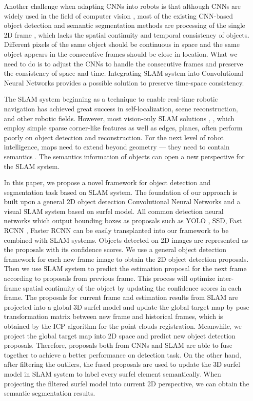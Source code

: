 \documentclass[conference]{IEEEtran}
\begin{document}
Another challenge when adapting CNNs into robots is that although CNNs are widely used in the field of computer vision \cite{Liu2015}, most of the existing CNN-based object detection and semantic segmentation methods are processing of the single 2D frame \cite{long2015fully}, \cite{Zheng2015} which lacks the spatial continuity and temporal consistency of objects. Different pixels of the same object should be continuous in space and the same object appears in the consecutive frames should be close in location. What we need to do is to adjust the CNNs to handle the consecutive frames and preserve the consistency  of space and time. Integrating SLAM system into Convolutional Neural Networks provides a possible solution to preserve time-space consistency. 

The SLAM system beginning as a technique to enable real-time robotic navigation has achieved great success in self-localization, scene reconstruction, and other robotic fields. However, most vision-only SLAM solutions \cite{Whelan15rss}, \cite{Whelan_real-timelarge}, \cite{Zuo2017} which employ simple sparse corner-like features as well as edges, planes, often perform poorly on object detection and reconstruction. For the next level of robot intelligence, maps need to extend beyond geometry — they need to contain semantics \cite{Kundu2014}. The semantics information of objects can open a new perspective for the SLAM system. 

In this paper, we propose a novel framework for object detection and segmentation task based on SLAM system. The foundation of our approach  is built upon a  general 2D object detection Convolutional Neural Networks and a visual SLAM system based on surfel model. All common detection neural networks which output bounding boxes as proposals such as YOLO \cite{Redmon2016}, SSD\cite{Liu2016}, Fast RCNN \cite{Girshick2015}, Faster RCNN \cite{ren2015faster} can be easily transplanted into our framework to be combined with SLAM systems. Objects detected on 2D images are represented as the proposals with its confidence scores.  We use a general object detection framework for each new frame image to obtain the 2D object detection proposals. Then we use SLAM system to predict the estimation proposal for the next frame according to  proposals from previous frame. This process will optimize inter-frame spatial continuity of the object by updating the confidence scores in each frame. The proposals for current frame and estimation results from SLAM are projected into a global 3D surfel model \cite{stuckler2014multi} and update the global target map by pose transformation matrix between new frame and historical  frames, which is obtained by the ICP algorithm for the point clouds registration. Meanwhile, we project the global target map into 2D space and predict new object detection proposals. Therefore, proposals both from CNNs and SLAM are able to fuse together to achieve a better performance on detection task. On the other hand, after filtering the outliers, the fused proposals are used to update the 3D surfel model in SLAM system to label every surfel element semantically. When projecting the filtered surfel model into current 2D perspective, we can obtain the semantic segmentation results.
\end{document}
